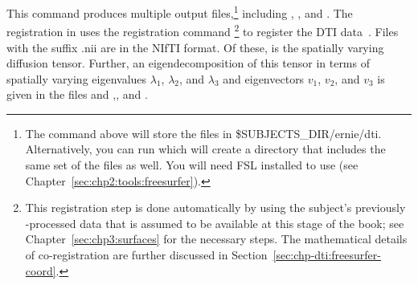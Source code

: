This command produces multiple output files,\footnote{The command above will 
store the files in \$SUBJECTS\_DIR/ernie/dti. Alternatively, you can run 
 which will create a directory 
 that includes the same set of the files as well. 
You will need FSL installed to use  (see 
Chapter~\ref{sec:chp2:tools:freesurfer}).} including
, , and . The
registration in  uses the registration command
\footnote{This registration step is done automatically by 
{\freesurfer} using the subject's previously {\freesurfer}-processed data that 
is assumed to be available at this stage of the book; see 
Chapter~\ref{sec:chp3:surfaces} for the necessary steps. The mathematical 
details of co-registration are further discussed in 
Section~\ref{sec:chp-dti:freesurfer-coord}.} to register the DTI
data~\cite{freesurfer-wiki}. Files with the suffix .nii are in the
NIfTI format. Of these,  is the spatially varying
diffusion tensor. Further, an eigendecomposition of this tensor in
terms of spatially varying eigenvalues $\lambda_1$, $\lambda_2$, and 
$\lambda_3$ and eigenvectors $v_1$, $v_2$, and $v_3$ is given in the files
 and ,,
and .

